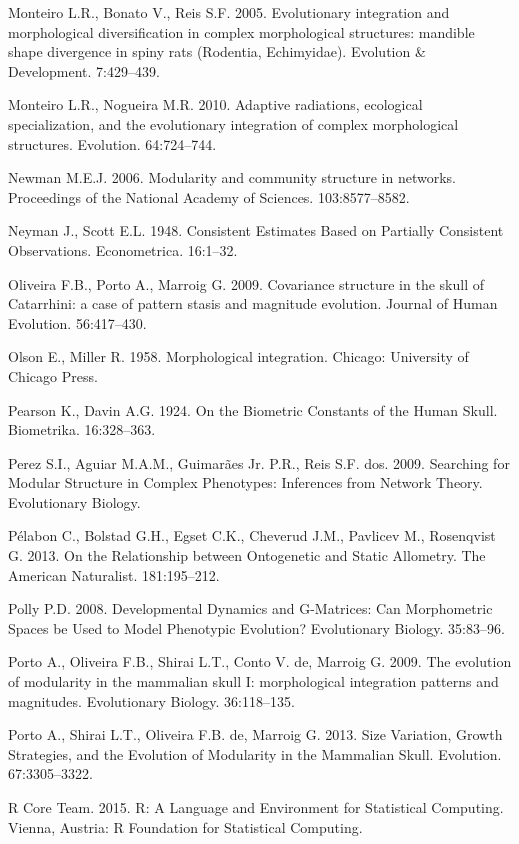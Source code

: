 \documentclass[12pt,]{article}
\begin{document}
Monteiro L.R., Bonato V., Reis S.F. 2005. Evolutionary integration and
morphological diversification in complex morphological structures:
mandible shape divergence in spiny rats (Rodentia, Echimyidae).
Evolution \& Development. 7:429--439.

Monteiro L.R., Nogueira M.R. 2010. Adaptive radiations, ecological
specialization, and the evolutionary integration of complex
morphological structures. Evolution. 64:724--744.

Newman M.E.J. 2006. Modularity and community structure in networks.
Proceedings of the National Academy of Sciences. 103:8577--8582.

Neyman J., Scott E.L. 1948. Consistent Estimates Based on Partially
Consistent Observations. Econometrica. 16:1--32.

Oliveira F.B., Porto A., Marroig G. 2009. Covariance structure in the
skull of Catarrhini: a case of pattern stasis and magnitude evolution.
Journal of Human Evolution. 56:417--430.

Olson E., Miller R. 1958. Morphological integration. Chicago: University
of Chicago Press.

Pearson K., Davin A.G. 1924. On the Biometric Constants of the Human
Skull. Biometrika. 16:328--363.

Perez S.I., Aguiar M.A.M., Guimarães Jr. P.R., Reis S.F. dos. 2009.
Searching for Modular Structure in Complex Phenotypes: Inferences from
Network Theory. Evolutionary Biology.

Pélabon C., Bolstad G.H., Egset C.K., Cheverud J.M., Pavlicev M.,
Rosenqvist G. 2013. On the Relationship between Ontogenetic and Static
Allometry. The American Naturalist. 181:195--212.

Polly P.D. 2008. Developmental Dynamics and G-Matrices: Can Morphometric
Spaces be Used to Model Phenotypic Evolution? Evolutionary Biology.
35:83--96.

Porto A., Oliveira F.B., Shirai L.T., Conto V. de, Marroig G. 2009. The
evolution of modularity in the mammalian skull I: morphological
integration patterns and magnitudes. Evolutionary Biology. 36:118--135.

Porto A., Shirai L.T., Oliveira F.B. de, Marroig G. 2013. Size
Variation, Growth Strategies, and the Evolution of Modularity in the
Mammalian Skull. Evolution. 67:3305--3322.

R Core Team. 2015. R: A Language and Environment for Statistical
Computing. Vienna, Austria: R Foundation for Statistical Computing.
\end{document}
